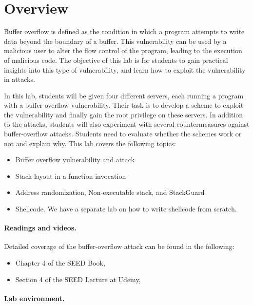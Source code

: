 
\section{Overview}


Buffer overflow is defined as the condition in which a program attempts to
write data beyond the boundary of a buffer. This
vulnerability can be used by a malicious user to alter the flow control of
the program, leading to the execution of malicious code.
The objective of this lab is for students to gain practical
insights into this type of vulnerability, and learn how to
exploit the vulnerability in attacks. 


In this lab, students will be given four different servers, each
running a program with a buffer-overflow vulnerability. 
Their task is to develop a scheme to exploit
the vulnerability and finally gain the root privilege on these servers.  
In addition to the attacks, students will also experiment with 
several countermeasures against buffer-overflow attacks.  
Students need to evaluate whether the schemes work or not and explain why. 
This lab covers the following topics:

\begin{itemize}[noitemsep]
\item Buffer overflow vulnerability and attack
\item Stack layout in a function invocation
\item Address randomization, Non-executable stack, and  StackGuard
\item Shellcode. We have a separate lab on how to write shellcode 
from scratch.
\end{itemize}



\paragraph{Readings and videos.}
Detailed coverage of the buffer-overflow attack can be found in the following:

\begin{itemize}
\item Chapter 4 of the SEED Book, \seedbook
\item Section 4 of the SEED Lecture at Udemy, \seedcsvideo
\end{itemize}


\paragraph{Lab environment.} \seedenvironmentC


